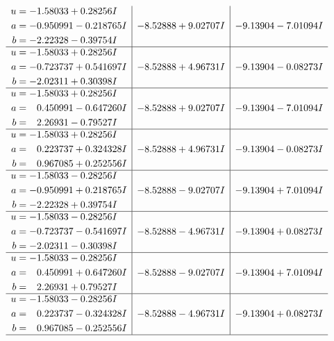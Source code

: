 \documentclass[1p]{elsarticle_modified}
\theoremstyle{definition}
\begin{document}
$$\begin{array}{c|c|c}
\begin{aligned}
u &= -1.58033 + 0.28256 I \\
a &= -0.950991 - 0.218765 I \\
b &= -2.22328 - 0.39754 I\end{aligned}
 & -8.52888 + 9.02707 I & -9.13904 - 7.01094 I \\ \hline\begin{aligned}
u &= -1.58033 + 0.28256 I \\
a &= -0.723737 + 0.541697 I \\
b &= -2.02311 + 0.30398 I\end{aligned}
 & -8.52888 + 4.96731 I & -9.13904 - 0.08273 I \\ \hline\begin{aligned}
u &= -1.58033 + 0.28256 I \\
a &= \phantom{-}0.450991 - 0.647260 I \\
b &= \phantom{-}2.26931 - 0.79527 I\end{aligned}
 & -8.52888 + 9.02707 I & -9.13904 - 7.01094 I \\ \hline\begin{aligned}
u &= -1.58033 + 0.28256 I \\
a &= \phantom{-}0.223737 + 0.324328 I \\
b &= \phantom{-}0.967085 + 0.252556 I\end{aligned}
 & -8.52888 + 4.96731 I & -9.13904 - 0.08273 I \\ \hline\begin{aligned}
u &= -1.58033 - 0.28256 I \\
a &= -0.950991 + 0.218765 I \\
b &= -2.22328 + 0.39754 I\end{aligned}
 & -8.52888 - 9.02707 I & -9.13904 + 7.01094 I \\ \hline\begin{aligned}
u &= -1.58033 - 0.28256 I \\
a &= -0.723737 - 0.541697 I \\
b &= -2.02311 - 0.30398 I\end{aligned}
 & -8.52888 - 4.96731 I & -9.13904 + 0.08273 I \\ \hline\begin{aligned}
u &= -1.58033 - 0.28256 I \\
a &= \phantom{-}0.450991 + 0.647260 I \\
b &= \phantom{-}2.26931 + 0.79527 I\end{aligned}
 & -8.52888 - 9.02707 I & -9.13904 + 7.01094 I \\ \hline\begin{aligned}
u &= -1.58033 - 0.28256 I \\
a &= \phantom{-}0.223737 - 0.324328 I \\
b &= \phantom{-}0.967085 - 0.252556 I\end{aligned}
 & -8.52888 - 4.96731 I & -9.13904 + 0.08273 I\\
 \hline 
 \end{array}$$\newpage\newpage\renewcommand{\arraystretch}{1}
\end{document}
